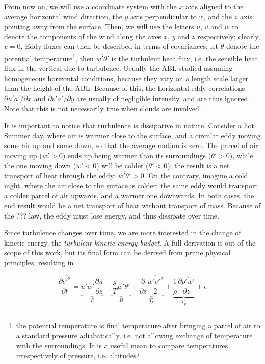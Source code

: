 \documentclass[12pt]{book}
\begin{document}
From now on, we will use a coordinate system with the $x$ axis aligned to the average horizontal wind direction, the $y$ axis perpendicular to it, and the $z$ axis pointing away from the surface. Then, we will use the letters $u$, $v$ and $w$ to denote the components of the wind along the axes $x$, $y$ and $z$ respectively; clearly, $\overline{v}=0$. Eddy fluxes can then be described in terms of covariances: let $\theta$ denote the potential temperature\footnote{the potential temperature is final temperature after bringing a parcel of air to a standard pressure adiabatically, i.e. not allowing exchange of temperature with the surroundings. It is a useful mean to compare temperatures irrespectively of pressure, i.e. altitude}, then $\overline{w'\theta'}$ is the turbulent heat flux, i.e. the sensible heat flux in the vertical due to turbulence. Usually the ABL  studied assuming homogeneous horizontal conditions, because they vary on a length scale larger than the height of the ABL. Because of this, the horizontal eddy correlations $\partial\overline{u'a'}/\partial x$ and $\partial\overline{v'a'}/\partial y$ are usually of negligible intensity, and are thus ignored. Note that this is not necessarily true when clouds are involved.

It is important to notice that turbulence is dissipative in nature. Consider a hot Summer day, where air is warmer close to the surface, and a circular eddy moving some air up and some down, so that the average motion is zero. The parcel of air moving up ($w'>0$) ends up being warmer than its surroundings ($\theta'>0$), while the one moving down ($w'<0$) will be colder ($\theta'<0$); the result is a net transport of heat through the eddy: $\overline{w'\theta'}>0$. On the contrary, imagine a cold night, where the air close to the surface is colder; the same eddy would transport a colder parcel of air upwards, and a warmer one downwards. In both cases, the end result would be a net transport of heat without transport of mass. Because of the ??? law, the eddy must lose energy, and thus dissipate over time.

Since turbulence changes over time, we are more interested in the change of kinetic energy, the \emph{turbulent kinetic energy budget}. A full derivation is out of the scope of this work, but its final form \citep{basicatm} can be derived from prime physical principles, resulting in

\begin{equation}
\frac{\partial\overline{{e'}^2}}{\partial t}
=\underbrace{\overline{u'w'}\frac{\partial\overline{u}}{\partial z}}_P
-\underbrace{\frac{g}{T}\overline{w'\theta'}}_B
+\underbrace{\frac{\partial}{\partial z}\frac{\overline{w'{e'}^2}}{2}}_{T_t}
+\underbrace{\frac{1}{\rho}\frac{\partial\overline{p'w'}}{\partial z}}_{T_p}
+\epsilon
\end{equation}
\end{document}
